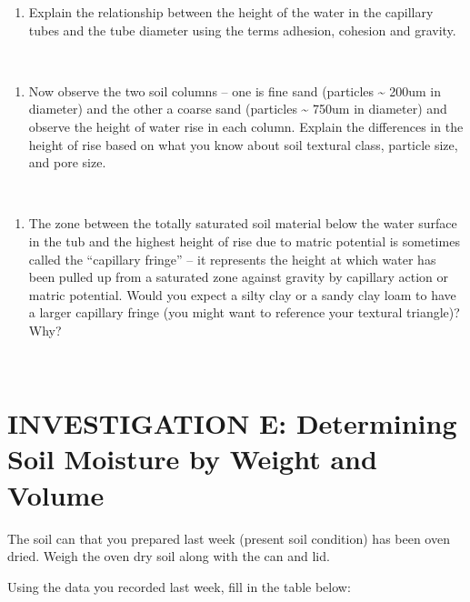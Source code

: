 \documentclass[
  letterpaper,
  twocolumn,
  portrait]{scrbook}
\providecommand{\tightlist}{%
  \setlength{\itemsep}{0pt}\setlength{\parskip}{0pt}}\usepackage{longtable,booktabs,array}
\begin{document}
\begin{enumerate}
\def\labelenumi{\arabic{enumi}.}
\tightlist
\item
  Explain the relationship between the height of the water in the
  capillary tubes and the tube diameter using the terms adhesion,
  cohesion and gravity.
\end{enumerate}

~ ~ ~ ~ ~ ~ ~ ~ ~ ~

\begin{enumerate}
\def\labelenumi{\arabic{enumi}.}
\setcounter{enumi}{1}
\tightlist
\item
  Now observe the two soil columns -- one is fine sand (particles
  \textasciitilde{} 200um in diameter) and the other a coarse sand
  (particles \textasciitilde{} 750um in diameter) and observe the height
  of water rise in each column. Explain the differences in the height of
  rise based on what you know about soil textural class, particle size,
  and pore size.
\end{enumerate}

~ ~ ~ ~ ~ ~ ~ ~ ~ ~

\begin{enumerate}
\def\labelenumi{\arabic{enumi}.}
\setcounter{enumi}{2}
\tightlist
\item
  The zone between the totally saturated soil material below the water
  surface in the tub and the highest height of rise due to matric
  potential is sometimes called the ``capillary fringe'' -- it
  represents the height at which water has been pulled up from a
  saturated zone against gravity by capillary action or matric
  potential. Would you expect a silty clay or a sandy clay loam to have
  a larger capillary fringe (you might want to reference your textural
  triangle)? Why?
\end{enumerate}

~ ~ ~ ~ ~ ~ ~ ~ ~ ~

\hypertarget{investigation-e-determining-soil-moisture-by-weight-and-volume}{%
\section{INVESTIGATION E: Determining Soil Moisture by Weight and
Volume}\label{investigation-e-determining-soil-moisture-by-weight-and-volume}}

The soil can that you prepared last week (present soil condition) has
been oven dried. Weigh the oven dry soil along with the can and lid.

Using the data you recorded last week, fill in the table below:
\end{document}
